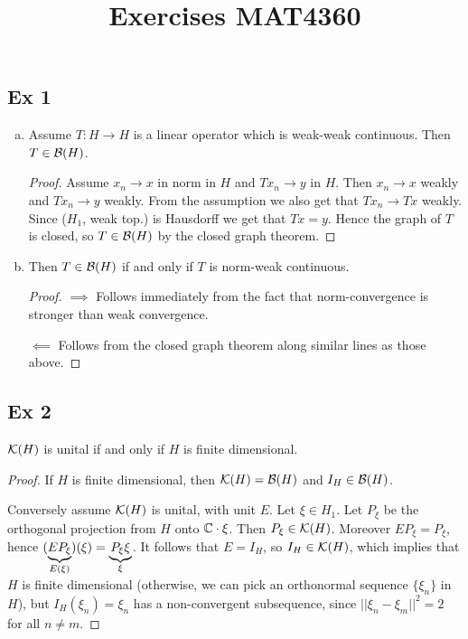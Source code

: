 \documentclass[10pt,english,a4paper]{article}
\title{Exercises MAT4360}
\theoremstyle{definition}
\begin{document}
\maketitle

\subsection*{Ex 1}
\begin{enumerate}[a)]
    \item 
Assume $T \colon H \to H$ is a linear operator which is weak-weak continuous. Then
$T \in \mathcal{B}(H)$.
\begin{proof}
    Assume $x_n \to x$ in norm in $H$ and $Tx_n \to y$  in $H$. Then 
    $x_n \to x$ weakly and $Tx_n \to y$ weakly. From the assumption we also get that 
    $Tx_n \to Tx$ weakly. Since ($H_1$, weak top.) is Hausdorff we get that 
    $Tx = y$. Hence the graph of $T$ is closed, so $T \in \mathcal{B}(H)$ by the closed 
    graph theorem.
\end{proof}

\item Then $T \in \mathcal{B}(H)$ if and only if $T$ is norm-weak continuous.
\begin{proof}
    $\implies$ Follows immediately from the fact that norm-convergence is stronger than weak convergence.

    $\impliedby$ Follows from the closed graph theorem along similar lines as those above. 
\end{proof}

\end{enumerate}

\subsection*{Ex 2}
$\mathcal{K}(H)$ is unital if and only if $H$ is finite dimensional. 

\begin{proof}
    If $H$ is finite dimensional, then $\mathcal{K}(H)=\mathcal{B}(H)$ and $I_{H} \in \mathcal{B}(H)$.

    Conversely assume $\mathcal{K}(H)$ is unital, with unit $E$. Let $\xi \in H_1$. Let 
    $P_{\xi}$ be the orthogonal projection from $H$ onto $\mathbb{C} \cdot \xi$. Then
    $P_{\xi} \in \mathcal{K}(H)$. Moreover $EP_{\xi} = P_{\xi}$, hence $(\underbrace{EP_{\xi}}_{E(\xi)})(\xi) = \underbrace{P_{\xi}\xi}_{\xi}$.
    It follows that $E = I_{H}$, so $I_H \in \mathcal{K}(H)$, which implies that $H$ is finite
    dimensional (otherwise, we can pick an orthonormal sequence $\{\xi_n\}$ in $H$),
    but $I_H(\xi_n) = \xi_n$ has a non-convergent subsequence, since 
    $||\xi_n - \xi_m||^2 = 2$ for all $n \neq m$.
\end{proof}
\end{document}
